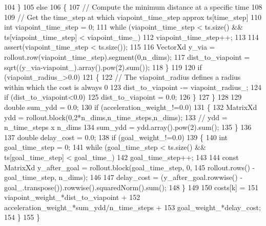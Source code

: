 \begin{DoxyCode}
104       \}
105       \textcolor{keywordflow}{else}
106       \{
107         \textcolor{comment}{// Compute the minimum distance at a specific time}
108         
109         \textcolor{comment}{// Get the time\_step at which viapoint\_time\_step approx ts[time\_step]}
110         \textcolor{keywordtype}{int} viapoint\_time\_step = 0;
111         \textcolor{keywordflow}{while} (viapoint\_time\_step < ts.size() && ts[viapoint\_time\_step] < viapoint\_time\_)
112           viapoint\_time\_step++;
113 
114         assert(viapoint\_time\_step < ts.size());
115 
116         VectorXd y\_via = rollout.row(viapoint\_time\_step).segment(0,n\_dims);
117         dist\_to\_viapoint = sqrt((y\_via-viapoint\_).array().pow(2).sum());
118       \}
119       
120       \textcolor{keywordflow}{if} (viapoint\_radius\_>0.0)
121       \{
122         \textcolor{comment}{// The viapoint\_radius defines a radius within which the cost is always 0}
123         dist\_to\_viapoint -= viapoint\_radius\_;
124         \textcolor{keywordflow}{if} (dist\_to\_viapoint<0.0)
125           dist\_to\_viapoint = 0.0;
126       \}
127     \}
128     
129     \textcolor{keywordtype}{double} sum\_ydd = 0.0;
130     \textcolor{keywordflow}{if} (acceleration\_weight\_!=0.0)
131     \{
132       MatrixXd ydd = rollout.block(0,2*n\_dims,n\_time\_steps,n\_dims);
133       \textcolor{comment}{// ydd = n\_time\_steps x n\_dims}
134       sum\_ydd = ydd.array().pow(2).sum();
135     \}
136 
137     \textcolor{keywordtype}{double} delay\_cost = 0.0;
138     \textcolor{keywordflow}{if} (goal\_weight\_!=0.0)
139     \{
140       \textcolor{keywordtype}{int} goal\_time\_step = 0;
141       \textcolor{keywordflow}{while} (goal\_time\_step < ts.size() && ts[goal\_time\_step] < goal\_time\_)
142         goal\_time\_step++;
143 
144       \textcolor{keyword}{const} MatrixXd y\_after\_goal = rollout.block(goal\_time\_step, 0,
145         rollout.rows() - goal\_time\_step, n\_dims);
146 
147       delay\_cost = (y\_after\_goal.rowwise() - goal\_.transpose()).rowwise().squaredNorm().sum();
148     \}
149 
150     costs[k] =  
151       viapoint\_weight\_*dist\_to\_viapoint + 
152       acceleration\_weight\_*sum\_ydd/n\_time\_steps + 
153       goal\_weight\_*delay\_cost;
154   \}
155 \}
\end{DoxyCode}
